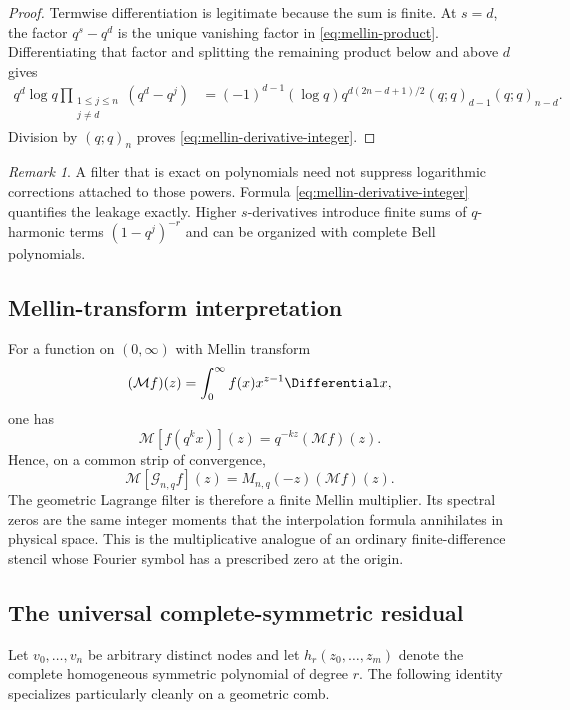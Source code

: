 \documentclass[11pt,a4paper,oneside]{article}
\theoremstyle{definition}
\theoremstyle{remark}
\newtheorem{remark}[remark]{Remark}
\newcommand{\Mellin}{\mathcal M}
\newcommand{\Gop}{\mathcal G}
\begin{document}
\begin{proof}
Termwise differentiation is legitimate because the sum is finite.  At
$s=d$, the factor $q^s-q^d$ is the unique vanishing factor in
\eqref{eq:mellin-product}.  Differentiating that factor and splitting the
remaining product below and above $d$ gives
\begin{align*}
 q^d\log q\prod_{\substack{1\le j\le n\\j\ne d}}(q^d-q^j)
 &=(-1)^{d-1}(\log q)
 q^{d(2n-d+1)/2}(q;q)_{d-1}(q;q)_{n-d}.
\end{align*}
Division by $(q;q)_n$ proves \eqref{eq:mellin-derivative-integer}.
\end{proof}

\begin{remark}
A filter that is exact on polynomials need not suppress logarithmic
corrections attached to those powers.  Formula
\eqref{eq:mellin-derivative-integer} quantifies the leakage exactly.  Higher
$s$-derivatives introduce finite sums of $q$-harmonic terms
$(1-q^j)^{-r}$ and can be organized with complete Bell polynomials.
\end{remark}

\subsection{Mellin-transform interpretation}

For a function on $(0,\infty)$ with Mellin transform
\[
 (\Mellin f)(z)=\int_0^\infty f(x)x^{z-1}\Differential x,
\]
one has
\[
 \Mellin[f(q^kx)](z)=q^{-kz}(\Mellin f)(z).
\]
Hence, on a common strip of convergence,
\begin{equation}
 \Mellin[\Gop_{n,q}f](z)=M_{n,q}(-z)(\Mellin f)(z).
 \label{eq:mellin-transform-multiplier}
\end{equation}
The geometric Lagrange filter is therefore a finite Mellin multiplier.  Its
spectral zeros are the same integer moments that the interpolation formula
annihilates in physical space.  This is the multiplicative analogue of an
ordinary finite-difference stencil whose Fourier symbol has a prescribed zero
at the origin.

\subsection{The universal complete-symmetric residual}

Let $v_0,\ldots,v_n$ be arbitrary distinct nodes and let
$h_r(z_0,\ldots,z_m)$ denote the complete homogeneous symmetric polynomial of
degree $r$.  The following identity specializes particularly cleanly on a
geometric comb.
\end{document}
